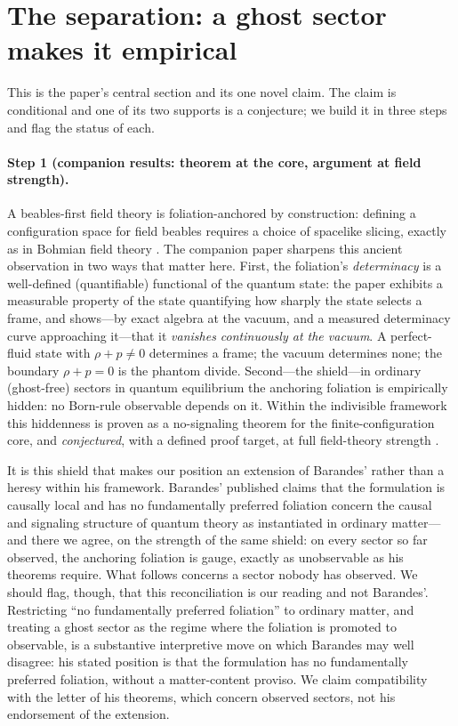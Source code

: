 \documentclass[11pt]{article}
\theoremstyle{remark}
\begin{document}
\section{The separation: a ghost sector makes it empirical}
\label{sec:separation}

This is the paper's central section and its one novel claim. The
claim is conditional and one of its two supports is a conjecture; we
build it in three steps and flag the status of each.

\paragraph{Step 1 (companion results: theorem at the core, argument
at field strength).} A beables-first field theory is
foliation-anchored by construction: defining a configuration space
for field beables requires a choice of spacelike slicing, exactly as
in Bohmian field theory \cite{DGNSZ}. The companion paper
\cite{instantaneous} sharpens this ancient observation in two ways
that matter here. First, the foliation's \emph{determinacy} is a
well-defined (quantifiable) functional of the quantum state: the paper
exhibits a measurable property of the state quantifying
how sharply the state selects a frame, and shows---by exact algebra at
the vacuum, and a measured determinacy curve approaching it---that it
\emph{vanishes continuously at the vacuum}. A perfect-fluid state with
$\rho+p\neq 0$ determines a frame; the vacuum determines none; the
boundary $\rho+p=0$ is the phantom divide. Second---the shield---in
ordinary (ghost-free) sectors in quantum equilibrium the anchoring
foliation is empirically hidden: no Born-rule observable depends on
it. Within the indivisible framework this hiddenness is proven as a
no-signaling theorem for the finite-configuration core, and
\emph{conjectured}, with a defined proof target, at full field-theory
strength \cite{instantaneous}.

It is this shield that makes our position an extension of Barandes'
rather than a heresy within his framework. Barandes' published claims
that the formulation is causally local \cite{BarandesCausal,BHK2025}
and has no fundamentally preferred foliation \cite{BarandesPoP} concern
the causal
and signaling structure of quantum theory as instantiated in ordinary
matter---and there we agree, on the strength of the same shield: on
every sector so far observed, the anchoring foliation is
gauge, exactly as unobservable as his theorems require. What follows
concerns a sector nobody has observed. We should flag, though, that
this reconciliation is our reading and not Barandes'. Restricting ``no
fundamentally preferred foliation'' to ordinary matter, and treating a
ghost sector as the regime where the foliation is promoted to
observable, is a substantive interpretive move on which Barandes may
well disagree: his stated position is that the formulation has no
fundamentally preferred foliation, without a matter-content proviso. We
claim compatibility with the letter of his theorems, which concern
observed sectors, not his endorsement of the extension.
\end{document}
